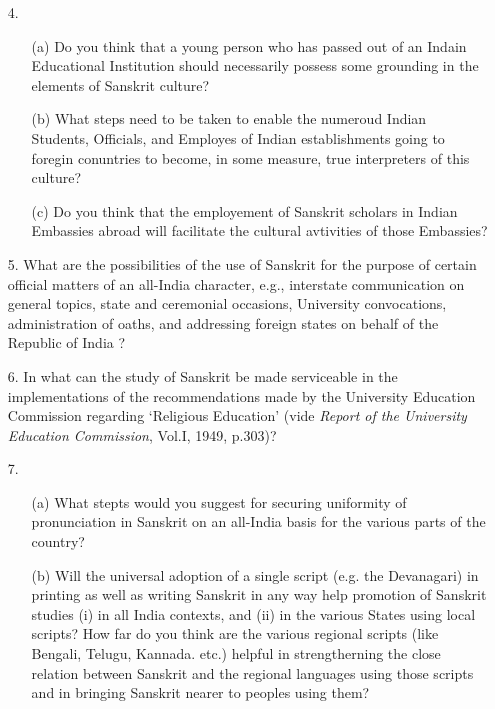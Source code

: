 {\rm 
\begin{itemize}
\item[4.] \begin{itemize}
             \item[(a)] Do you think that a young person who has passed out of an Indain Educational Institution should necessarily possess some grounding in the elements of Sanskrit culture? 
             
             \item[(b)] What steps need to be taken to enable the numeroud Indian Students, Officials, and Employes of Indian establishments going to foregin conuntries to become, in some measure, true interpreters of this culture?
             
             \item[(c)] Do you think that the employement of Sanskrit scholars in Indian Embassies abroad will facilitate the cultural avtivities of those Embassies?
             \end{itemize}
             
\item[5.] What are the possibilities of the use of Sanskrit for the purpose of certain official matters of an all-India character, e.g., interstate communication on general topics, state and ceremonial occasions, University convocations, administration of oaths, and addressing foreign states on behalf of the Republic of India ?  
  
  \item[6.] In what can the study of Sanskrit be made serviceable in the implementations of the recommendations made by the University Education Commission regarding `Religious Education' (vide {\textit {Report of the University Education Commission}}, Vol.I, 1949, p.303)? 
  
  \item[7.] \begin{itemize}
            \item[(a)] What stepts would you suggest for securing uniformity of pronunciation in Sanskrit on an all-India basis for the various parts of the country?
            \item[(b)] Will the universal adoption of a single script (e.g. the Devanagari) in printing as well as writing Sanskrit in any way help promotion of Sanskrit studies (i) in all India contexts, and (ii) in the various States using local scripts? How far do you think are the various regional scripts (like Bengali, Telugu, Kannada. etc.) helpful in strengtherning the close relation between Sanskrit and the regional languages using those scripts and in bringing  Sanskrit nearer to peoples using them?
            \end{itemize}
\end{itemize}
}


